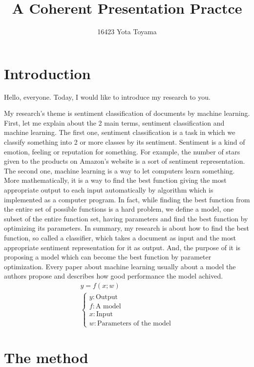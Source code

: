 \documentclass{notes}
\title{A Coherent Presentation Practce}
\author{16423 Yota Toyama}
\date{}
\begin{document}
\maketitle


\section{Introduction}

Hello, everyone.
Today, I would like to introduce my research to you.

My research's theme is sentiment classification of documents
by machine learning.
First, let me explain about the 2 main terms, sentiment classification
and machine learning.
The first one, sentiment classification is a task
in which we classify something into 2 or more classes by its sentiment.
Sentiment is a kind of emotion, feeling or reputation for something.
For example, the number of stars given to the products on Amazon's website
is a sort of sentiment representation.
The second one, machine learning is a way to let computers learn something.
More mathematically, it is a way to find the best function
giving the most appropriate output to each input automatically by algorithm
which is implemented as a computer program.
In fact, while finding the best function from the entire set
of possible functions is a hard problem, we define a model,
one subset of the entire function set, having parameters
and find the best function by optimizing its parameters.
In summary, my research is about how to find the best function,
so called a classifier, which takes a document as input
and the most appropriate sentiment representation for it as output.
And, the purpose of it is proposing a model which can become the best function
by parameter optimization.
Every paper about machine learning usually about a model the authors propose
and describes how good performance the model achived.
\begin{gather*}
  y = f(x; w) \\
  \begin{cases}
    y : \text{Output} \\
    f : \text{A model} \\
    x : \text{Input} \\
    w : \text{Parameters of the model}
  \end{cases}
\end{gather*}


\section{The method}
\end{document}
